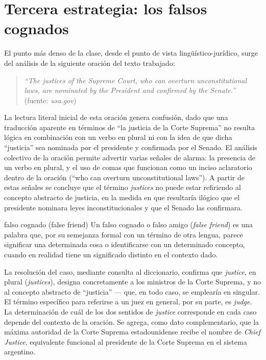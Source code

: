 \documentclass[12pt,oneside]{book}
\begin{document}
\section{Tercera estrategia: los falsos cognados}

El punto más denso de la clase, desde el punto de vista lingüístico-jurídico, surge del análisis de la siguiente oración del texto trabajado:

\begin{quote}
\textit{``The justices of the Supreme Court, who can overturn unconstitutional laws, are nominated by the President and confirmed by the Senate.''} (fuente: \textit{usa.gov})
\end{quote}

La lectura literal inicial de esta oración genera confusión, dado que una traducción aparente en términos de ``la justicia de la Corte Suprema'' no resulta lógica en combinación con un verbo en plural ni con la idea de que dicha ``justicia'' sea nominada por el presidente y confirmada por el Senado. El análisis colectivo de la oración permite advertir varias señales de alarma: la presencia de un verbo en plural, y el uso de comas que funcionan como un inciso aclaratorio dentro de la oración (``who can overturn unconstitutional laws''). A partir de estas señales se concluye que el término \textit{justices} no puede estar refiriendo al concepto abstracto de justicia, en la medida en que resultaría ilógico que el presidente nominara leyes inconstitucionales y que el Senado las confirmara.

\begin{definition}{falso cognado (false friend)}
Un falso cognado o falso amigo (\textit{false friend}) es una palabra que, por su semejanza formal con un término de otra lengua, parece significar una determinada cosa o identificarse con un determinado concepto, cuando en realidad tiene un significado distinto en el contexto dado.
\end{definition}

La resolución del caso, mediante consulta al diccionario, confirma que \textit{justice}, en plural (\textit{justices}), designa concretamente a los ministros de la Corte Suprema, y no al concepto abstracto de ``justicia'' --- que, en todo caso, se emplearía en singular. El término específico para referirse a un juez en general, por su parte, es \textit{judge}. La determinación de cuál de los dos sentidos de \textit{justice} corresponde en cada caso depende del contexto de la oración. Se agrega, como dato complementario, que la máxima autoridad de la Corte Suprema estadounidense recibe el nombre de \textit{Chief Justice}, equivalente funcional al presidente de la Corte Suprema en el sistema argentino.
\end{document}
